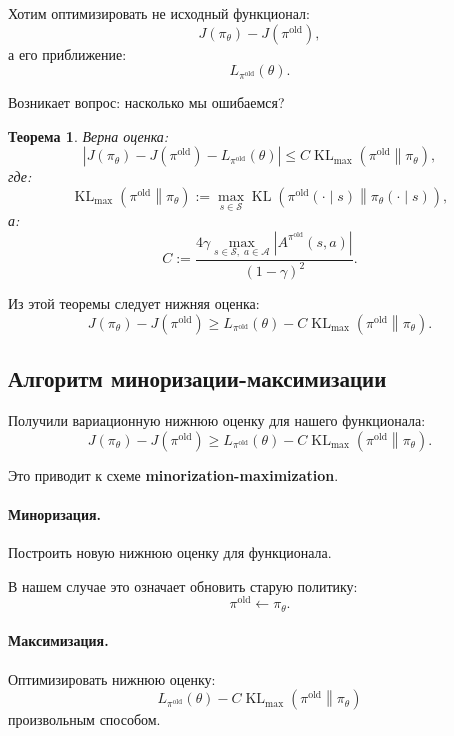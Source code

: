 \documentclass[12pt,a4paper]{article}
\newtheorem{theorem}{Теорема}
\begin{document}
Хотим оптимизировать не исходный функционал:
\[
J(\pi_\theta)-J(\pi^{\mathrm{old}}),
\]
а его приближение:
\[
L_{\pi^{\mathrm{old}}}(\theta).
\]

Возникает вопрос: насколько мы ошибаемся?

\begin{theorem}
Верна оценка:
\[
\left|
J(\pi_\theta)
-
J(\pi^{\mathrm{old}})
-
L_{\pi^{\mathrm{old}}}(\theta)
\right|
\le
C
\operatorname{KL}_{\max}
\left(
\pi^{\mathrm{old}}
\middle\|
\pi_\theta
\right),
\]
где:
\[
\operatorname{KL}_{\max}
\left(
\pi^{\mathrm{old}}
\middle\|
\pi_\theta
\right)
:=
\max_{s\in\mathcal S}
\operatorname{KL}
\left(
\pi^{\mathrm{old}}(\cdot\mid s)
\middle\|
\pi_\theta(\cdot\mid s)
\right),
\]
а:
\[
C
:=
\frac{
4\gamma
\max\limits_{s\in\mathcal S,\;a\in\mathcal A}
\left|
A^{\pi^{\mathrm{old}}}(s,a)
\right|
}{
(1-\gamma)^2
}.
\]
\end{theorem}

Из этой теоремы следует нижняя оценка:
\[
J(\pi_\theta)
-
J(\pi^{\mathrm{old}})
\ge
L_{\pi^{\mathrm{old}}}(\theta)
-
C
\operatorname{KL}_{\max}
\left(
\pi^{\mathrm{old}}
\middle\|
\pi_\theta
\right).
\]

\subsection{Алгоритм миноризации-максимизации}

Получили вариационную нижнюю оценку для нашего функционала:
\[
J(\pi_\theta)
-
J(\pi^{\mathrm{old}})
\ge
L_{\pi^{\mathrm{old}}}(\theta)
-
C
\operatorname{KL}_{\max}
\left(
\pi^{\mathrm{old}}
\middle\|
\pi_\theta
\right).
\]

Это приводит к схеме \textbf{minorization-maximization}.

\paragraph{Миноризация.}

Построить новую нижнюю оценку для функционала.

В нашем случае это означает обновить старую политику:
\[
\pi^{\mathrm{old}}
\leftarrow
\pi_\theta.
\]

\paragraph{Максимизация.}

Оптимизировать нижнюю оценку:
\[
L_{\pi^{\mathrm{old}}}(\theta)
-
C
\operatorname{KL}_{\max}
\left(
\pi^{\mathrm{old}}
\middle\|
\pi_\theta
\right)
\]
произвольным способом.
\end{document}

